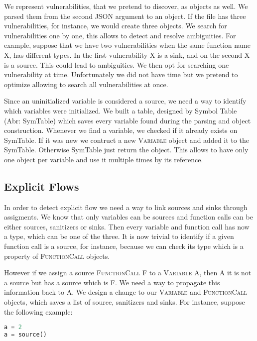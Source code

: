\documentclass[times, twoside, watermark]{zHenriquesLab-StyleBioRxiv}
\begin{document}
We represent vulnerabilities, that we pretend to discover, as objects as well. We parsed them from the 
second JSON argument to an object. If the file has three vulnerabilities, for instance, we would create
three objects. We search for vulnerabilities one by one, this allows to detect and resolve ambiguities.
For example, suppose that we have two vulnerabilities when the same function name X, has different types.
In the first vulnerability X is a sink, and on the second X is a source. This could lead to ambiguities.
We then opt for searching one vulnerability at time. Unfortunately we did not have time but we pretend
to optimize allowing to search all vulnerabilities at once.

Since an uninitialized variable is considered a source, we need a way to identify which variables were
initialized. We built a table, designed by Symbol Table (Abr: SymTable) which saves every variable found
during the parsing and object construction.
Whenever we find a variable, we checked if it already exists on SymTable. If it was new we contruct a
new \textsc{Variable} object and added it to the SymTable. Otherwise SymTable just return the object.
This allows to have only one object per variable and use it multiple times by its reference.

\subsection*{Explicit Flows}
In order to detect explicit flow we need a way to link sources and sinks through assigments.
We know that only variables can be sources and function calls can be either sources, sanitizers or sinks.
Then every variable and function call has now a type, which can be one of the three. It is now trivial
to identify if a given function call is a source, for instance, because we can check its type which is a
property of \textsc{FunctionCall} objects.

However if we assign a source \textsc{FunctionCall} F to a \textsc{Variable} A, then A it is not a source
but has a source which is F. We need a way to propagate this information back to A.
We design a change to our \textsc{Variable} and \textsc{FunctionCall} objects, which saves a list of source,
sanitizers and sinks. For instance, suppose the following example:

\begin{lstlisting}[language=Python]
a = 2
a = source()
\end{lstlisting}
\end{document}
